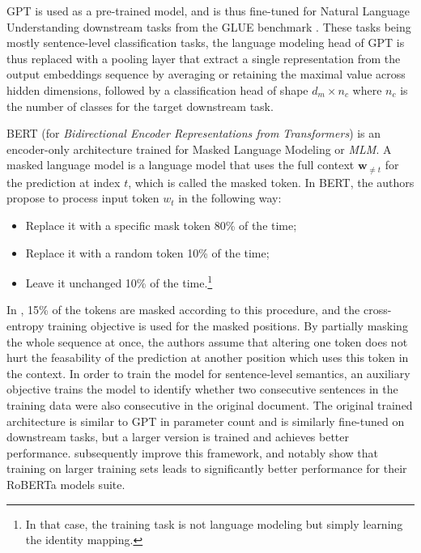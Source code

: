 GPT is used as a pre-trained model, and is thus fine-tuned for Natural Language Understanding downstream tasks from the GLUE benchmark \citep{wang-etal-2018-glue}. These tasks being mostly sentence-level classification tasks, the language modeling head of GPT is thus replaced with a pooling layer that extract a single representation from the output embeddings sequence by averaging or retaining the maximal value across hidden dimensions, followed by a classification head of shape $d_m \times n_c$ where $n_c$ is the number of classes for the target downstream task.

BERT (for \textit{Bidirectional Encoder Representations from Transformers}) is an encoder-only architecture trained for Masked Language Modeling or \textit{MLM}. A masked language model is a language model that uses the full context $\mathbf{w}_{\neq t}$ for the prediction at index $t$, which is called the masked token. In BERT, the authors propose to process input token $w_t$ in the following way:
\begin{itemize}
    \item Replace it with a specific mask token 80\% of the time;
    \item Replace it with a random token 10\% of the time;
    \item Leave it unchanged 10\% of the time.\footnote{In that case, the training task is not language modeling but simply learning the identity mapping.}
\end{itemize}

In \citet{devlin-etal-2019-bert}, 15\% of the tokens are masked according to this procedure, and the cross-entropy training objective is used for the masked positions. By partially masking the whole sequence at once, the authors assume that altering one token does not hurt the feasability of the prediction at another position which uses this token in the context. In order to train the model for sentence-level semantics, an auxiliary objective trains the model to identify whether two consecutive sentences in the training data were also consecutive in the original document.
The original trained architecture is similar to GPT in parameter count and is similarly fine-tuned on downstream tasks, but a larger version is trained and achieves better performance. \citet{roberta} subsequently improve this framework, and notably show that training on larger training sets leads to significantly better performance for their RoBERTa models suite.

